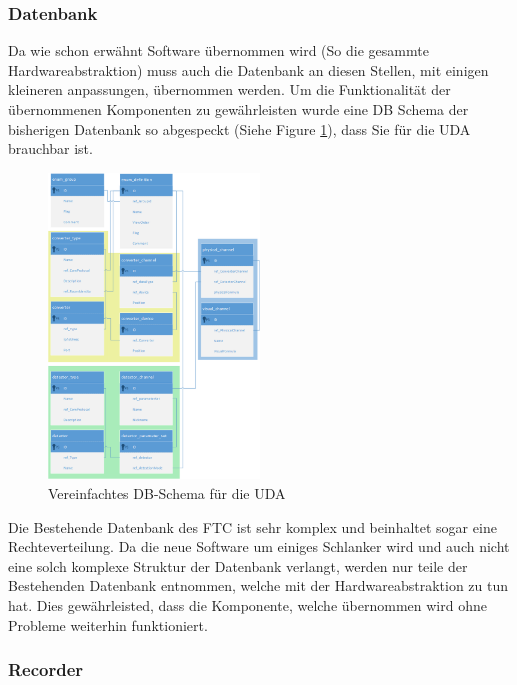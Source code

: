\documentclass[10pt]{scrartcl}
\begin{document}
\subsubsection{Datenbank}
Da wie schon erwähnt Software übernommen wird (So die gesammte Hardwareabstraktion) muss auch die Datenbank an diesen Stellen, mit einigen kleineren anpassungen, übernommen werden. Um die Funktionalität der übernommenen Komponenten zu gewährleisten wurde eine DB Schema der bisherigen Datenbank so abgespeckt (Siehe Figure \ref{fig:DBSchemaUDA}), dass Sie für die UDA brauchbar ist.
\begin{figure}[htbp] 
	\centering
	\includegraphics[width=0.5\textwidth]{DBSchemaUDA}
	\caption{Vereinfachtes DB-Schema für die UDA}
	\label{fig:DBSchemaUDA}
\end{figure}

Die Bestehende Datenbank des FTC ist sehr komplex und beinhaltet sogar eine Rechteverteilung. Da die neue Software um einiges Schlanker wird und auch nicht eine solch komplexe Struktur der Datenbank verlangt, werden nur teile der Bestehenden Datenbank entnommen, welche mit der Hardwareabstraktion zu tun hat. Dies gewährleisted, dass die Komponente, welche übernommen wird ohne Probleme weiterhin funktioniert. 
\subsubsection{Recorder}
\end{document}
